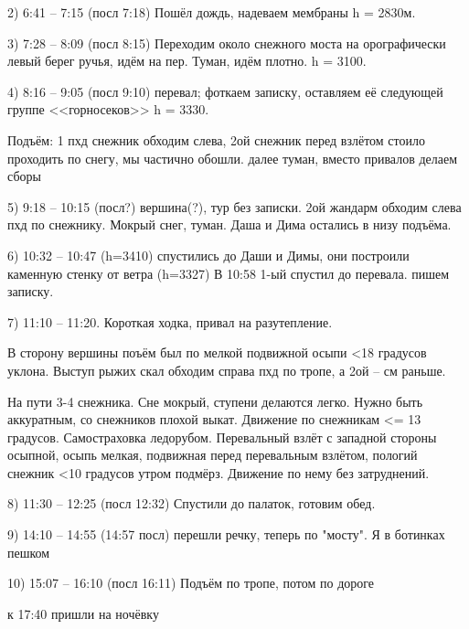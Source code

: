 2) 6:41 -- 7:15 (посл 7:18) Пошёл дождь, надеваем мембраны h = 2830м.

3) 7:28 -- 8:09 (посл 8:15) Переходим около снежного моста на орографически левый берег ручья, идём на пер.  Туман, идём плотно. h = 3100.

4) 8:16 -- 9:05 (посл 9:10) перевал; фоткаем записку, оставляем её следующей группе <<горносеков>> h = 3330.

Подъём: 1 пхд снежник обходим слева, 2ой снежник перед взлётом стоило проходить по снегу, мы частично обошли. далее туман, вместо привалов делаем сборы

5) 9:18 -- 10:15 (посл?) вершина(?), тур без записки. 2ой жандарм обходим слева пхд по снежнику. Мокрый снег, туман. Даша и Дима остались в низу подъёма.

6) 10:32 -- 10:47 (h=3410) спустились до Даши и Димы, они построили каменную стенку от ветра (h=3327) В 10:58 1-ый спустил до перевала. пишем записку.

7) 11:10 -- 11:20. Короткая ходка, привал на разутепление.

В сторону вершины поъём был по мелкой подвижной осыпи <18 градусов уклона. Выступ рыжих скал обходим справа пхд по тропе, а 2ой -- см раньше.

На пути 3-4 снежника. Сне мокрый, ступени делаются легко. Нужно быть аккуратным, со снежников плохой выкат. Движение по снежникам <= 13 градусов. Самостраховка ледорубом. Перевальный взлёт с западной стороны осыпной, осыпь мелкая, подвижная перед перевальным взлётом, пологий снежник <10 градусов утром подмёрз. Движение по нему без затруднений.

8) 11:30 -- 12:25 (посл 12:32) Спустили до палаток, готовим обед.

9) 14:10 -- 14:55 (14:57 посл) перешли речку, теперь по "мосту". Я в ботинках пешком

10) 15:07 -- 16:10 (посл 16:11) Подъём по тропе, потом по дороге

к 17:40 пришли на ночёвку


    \FloatBarrier
